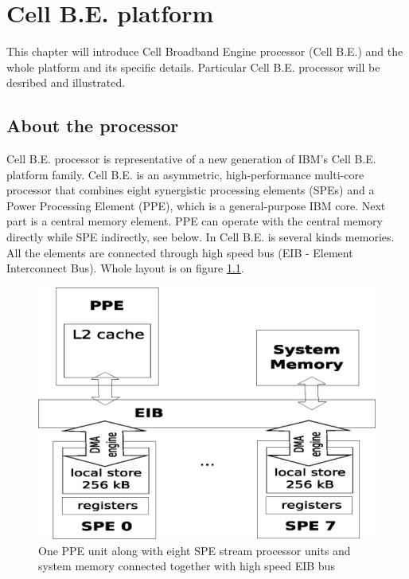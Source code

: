 \chapter{Cell B.E. platform}

This chapter will introduce Cell Broadband Engine processor (Cell B.E.) and the whole platform and its specific details.
Particular Cell B.E. processor will be desribed and illustrated.

\section{About the processor}

Cell B.E. processor is representative of a new generation of IBM's Cell B.E. platform family.
Cell B.E. is an asymmetric, high-performance multi-core processor that combines eight synergistic processing elements (SPEs) and a Power Processing Element (PPE), which is a general-purpose IBM  core.
Next part is a central memory element.
PPE can operate with the central memory directly while SPE indirectly, see below.
In Cell B.E. is several kinds memories.
All the elements are connected through high speed bus (EIB - Element Interconnect Bus).
Whole layout is on figure \ref{fg:processorLayout}.

\begin{figure}
    \centering
    \includegraphics[width=\textwidth]{data/cellLayout}
    \caption[Cell B.E. processor layout]{One PPE unit along with eight SPE stream processor units and system memory connected together with high speed EIB bus}
    \label{fg:processorLayout}
\end{figure}

